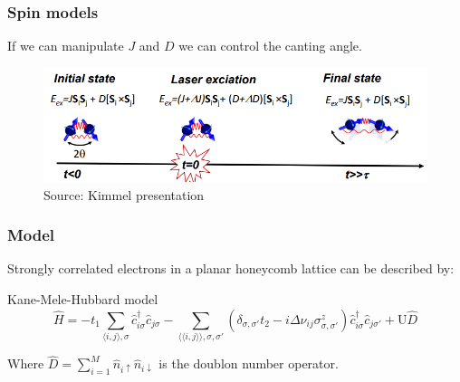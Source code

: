 \documentclass{beamer}
\begin{document}
\begin{frame}
\frametitle{Spin models}
If we can manipulate $J$ and $D$ we can control the canting angle.
\begin{figure}
\includegraphics[width=1\linewidth]{../Figures/canted_afm.png}
\caption{Source: Kimmel presentation}
\end{figure}
\end{frame}




\begin{frame}
\frametitle{Model}
Strongly correlated electrons in a planar honeycomb lattice can be described by:
\begin{block}{Kane-Mele-Hubbard model}
\begin{equation}
\hat{H} = - t_1\sum_{\langle i,j \rangle, \sigma} \hat{c}_{i \sigma}^\dagger \hat{c}_{j \sigma} -
	\sum_{\langle \langle i,j \rangle \rangle, \sigma, \sigma'}(\delta_{\sigma,\sigma'}t_2 - i\Delta\nu_{ij}\sigma^z_{\sigma, \sigma'})\hat{c}_{i \sigma}^\dagger \hat{c}_{j \sigma'} + \text{U}\hat{D}\nonumber
\end{equation}

Where $\hat{D} = \sum_{i=1}^M \hat{n}_{i\uparrow}\hat{n}_{i\downarrow}$ is the doublon number operator.

\end{block}
\end{frame}

\end{document}

